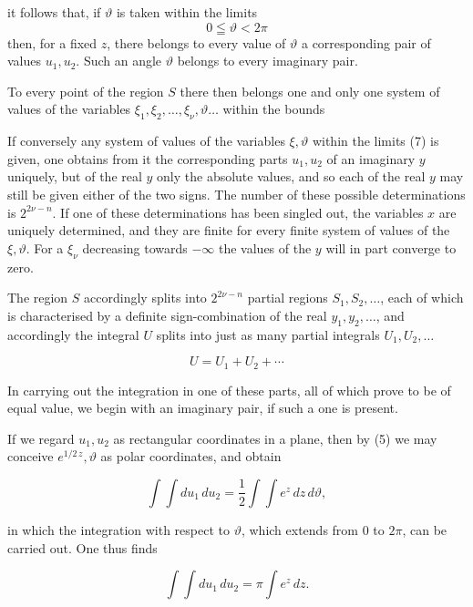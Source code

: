 it follows that, if $\vartheta$ is taken within the limits
\[
0 \leqq \vartheta < 2\pi
\]
then, for a fixed $z$, there belongs to every value of $\vartheta$ a corresponding pair of values $u_1, u_2$. Such an angle $\vartheta$ belongs to every imaginary pair.

To every point of the region $S$ there then belongs one and only one system of values of the variables $\xi_1, \xi_2, \ldots, \xi_\nu, \vartheta \ldots$ within the bounds


If conversely any system of values of the variables $\xi, \vartheta$ within the limits (7) is given, one obtains from it the corresponding parts $u_1, u_2$ of an imaginary $y$ uniquely, but of the real $y$ only the absolute values, and so each of the real $y$ may still be given either of the two signs. The number of these possible determinations is $2^{2\nu-n}$. If one of these determinations has been singled out, the variables $x$ are uniquely determined, and they are finite for every finite system of values of the $\xi, \vartheta$. For a $\xi_\nu$ decreasing towards $-\infty$ the values of the $y$ will in part converge to zero.

The region $S$ accordingly splits into $2^{2\nu-n}$ partial regions $S_1, S_2, \ldots$, each of which is characterised by a definite sign-combination of the real $y_1, y_2, \ldots$, and accordingly the integral $U$ splits into just as many partial integrals $U_1, U_2, \ldots$

\[
U = U_1+U_2+\cdots
\]

In carrying out the integration in one of these parts, all of which prove to be of equal value, we begin with an imaginary pair, if such a one is present.

If we regard $u_1, u_2$ as rectangular coordinates in a plane, then by (5) we may conceive $e^{1/2\,z}, \vartheta$ as polar coordinates, and obtain

\[
\int\int du_1\,du_2 = \frac12\int\int e^z\,dz\,d\vartheta,
\]

in which the integration with respect to $\vartheta$, which extends from $0$ to $2\pi$, can be carried out. One thus finds

\[
\int\int du_1\,du_2 = \pi\int e^z\,dz.
\]
